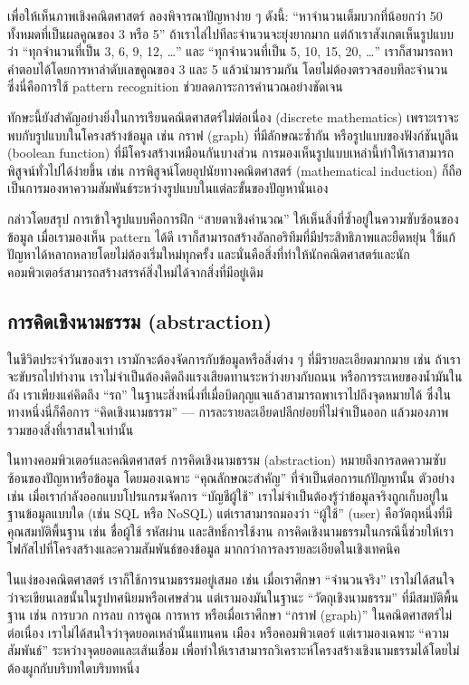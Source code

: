 เพื่อให้เห็นภาพเชิงคณิตศาสตร์ ลองพิจารณาปัญหาง่าย ๆ ดังนี้:  
“หาจำนวนเต็มบวกที่น้อยกว่า 50 ทั้งหมดที่เป็นผลคูณของ 3 หรือ 5”  
ถ้าเราไล่ไปทีละจำนวนจะยุ่งยากมาก แต่ถ้าเราสังเกตเห็นรูปแบบว่า “ทุกจำนวนที่เป็น 3, 6, 9, 12, …” และ “ทุกจำนวนที่เป็น 5, 10, 15, 20, …” เราก็สามารถหาคำตอบได้โดยการหาลำดับเลขคูณของ 3 และ 5 แล้วนำมารวมกัน โดยไม่ต้องตรวจสอบทีละจำนวน ซึ่งนี่คือการใช้ pattern recognition ช่วยลดภาระการคำนวณอย่างชัดเจน

ทักษะนี้ยังสำคัญอย่างยิ่งในการเรียนคณิตศาสตร์ไม่ต่อเนื่อง (discrete mathematics) เพราะเราจะพบกับรูปแบบในโครงสร้างข้อมูล เช่น กราฟ (graph) ที่มีลักษณะซ้ำกัน หรือรูปแบบของฟังก์ชันบูลีน (boolean function) ที่มีโครงสร้างเหมือนกันบางส่วน การมองเห็นรูปแบบเหล่านี้ทำให้เราสามารถพิสูจน์ทั่วไปได้ง่ายขึ้น เช่น การพิสูจน์โดยอุปนัยทางคณิตศาสตร์ (mathematical induction) ก็ถือเป็นการมองหาความสัมพันธ์ระหว่างรูปแบบในแต่ละขั้นของปัญหานั่นเอง

กล่าวโดยสรุป การเข้าใจรูปแบบคือการฝึก “สายตาเชิงคำนวณ” ให้เห็นสิ่งที่ซ้ำอยู่ในความซับซ้อนของข้อมูล เมื่อเรามองเห็น pattern ได้ดี เราก็สามารถสร้างอัลกอริทึมที่มีประสิทธิภาพและยืดหยุ่น ใช้แก้ปัญหาได้หลากหลายโดยไม่ต้องเริ่มใหม่ทุกครั้ง และนั่นคือสิ่งที่ทำให้นักคณิตศาสตร์และนักคอมพิวเตอร์สามารถสร้างสรรค์สิ่งใหม่ได้จากสิ่งที่มีอยู่เดิม


\subsection{การคิดเชิงนามธรรม (abstraction)}
ในชีวิตประจำวันของเรา เรามักจะต้องจัดการกับข้อมูลหรือสิ่งต่าง ๆ ที่มีรายละเอียดมากมาย เช่น ถ้าเราจะขับรถไปทำงาน เราไม่จำเป็นต้องคิดถึงแรงเสียดทานระหว่างยางกับถนน หรือการระเหยของน้ำมันในถัง เราเพียงแค่คิดถึง “รถ” ในฐานะสิ่งหนึ่งที่เมื่อบิดกุญแจแล้วสามารถพาเราไปถึงจุดหมายได้ ซึ่งในทางหนึ่งนี่ก็คือการ “คิดเชิงนามธรรม” — การละรายละเอียดปลีกย่อยที่ไม่จำเป็นออก แล้วมองภาพรวมของสิ่งที่เราสนใจเท่านั้น

ในทางคอมพิวเตอร์และคณิตศาสตร์ การคิดเชิงนามธรรม (abstraction) หมายถึงการลดความซับซ้อนของปัญหาหรือข้อมูล โดยมองเฉพาะ “คุณลักษณะสำคัญ” ที่จำเป็นต่อการแก้ปัญหานั้น ตัวอย่างเช่น เมื่อเรากำลังออกแบบโปรแกรมจัดการ “บัญชีผู้ใช้” เราไม่จำเป็นต้องรู้ว่าข้อมูลจริงถูกเก็บอยู่ในฐานข้อมูลแบบใด (เช่น SQL หรือ NoSQL) แต่เราสามารถมองว่า “ผู้ใช้” (user) คือวัตถุหนึ่งที่มีคุณสมบัติพื้นฐาน เช่น ชื่อผู้ใช้ รหัสผ่าน และสิทธิ์การใช้งาน การคิดเชิงนามธรรมในกรณีนี้ช่วยให้เราโฟกัสไปที่โครงสร้างและความสัมพันธ์ของข้อมูล มากกว่าการลงรายละเอียดในเชิงเทคนิค

ในแง่ของคณิตศาสตร์ เราก็ใช้การนามธรรมอยู่เสมอ เช่น เมื่อเราศึกษา “จำนวนจริง” เราไม่ได้สนใจว่าจะเขียนเลขนั้นในรูปทศนิยมหรือเศษส่วน แต่เรามองมันในฐานะ “วัตถุเชิงนามธรรม” ที่มีสมบัติพื้นฐาน เช่น การบวก การลบ การคูณ การหาร หรือเมื่อเราศึกษา “กราฟ (graph)” ในคณิตศาสตร์ไม่ต่อเนื่อง เราไม่ได้สนใจว่าจุดยอดเหล่านั้นแทนคน เมือง หรือคอมพิวเตอร์ แต่เรามองเฉพาะ “ความสัมพันธ์” ระหว่างจุดยอดและเส้นเชื่อม เพื่อทำให้เราสามารถวิเคราะห์โครงสร้างเชิงนามธรรมได้โดยไม่ต้องผูกกับบริบทใดบริบทหนึ่ง


